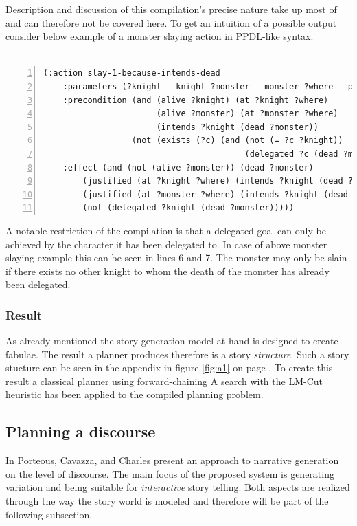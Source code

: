 Description and discussion of this compilation's precise nature take up most of \cite{Haslum14} and can therefore not be covered here. To get an intuition of a possible output consider below example of a monster slaying action in PPDL-like syntax.\\
\\
\begin{lstlisting}[frame=single,basicstyle=\scriptsize,numbers=left,numberstyle=\tiny]
(:action slay-1-because-intends-dead
    :parameters (?knight - knight ?monster - monster ?where - place)
    :precondition (and (alive ?knight) (at ?knight ?where)
                       (alive ?monster) (at ?monster ?where)
                       (intends ?knight (dead ?monster))
                  (not (exists (?c) (and (not (= ?c ?knight))
                                         (delegated ?c (dead ?monster))))))
    :effect (and (not (alive ?monster)) (dead ?monster)
        (justified (at ?knight ?where) (intends ?knight (dead ?monster)))
        (justified (at ?monster ?where) (intends ?knight (dead ?monster)))
        (not (delegated ?knight (dead ?monster)))))
\end{lstlisting}
A notable restriction of the compilation is that a delegated goal can only be achieved by the character it has been delegated to. In case of above monster slaying example this can be seen in lines 6 and 7. The monster may only be slain if there exists no other knight to whom the death of the monster has already been delegated.
\subsubsection{Result}
As already mentioned the story generation model at hand is designed to create fabulae. The result a planner produces therefore is a story \emph{structure}. Such a story stucture can be seen in the appendix in figure \ref{fig:a1} on page \pageref{fig:a2}. To create this result a classical planner using forward-chaining A\text{*} search with the LM-Cut heuristic has been applied to the compiled planning problem.

\subsection{Planning a discourse}\label{discourse}
In \cite{Porteous10} Porteous, Cavazza, and Charles present an approach to narrative generation on the level of discourse. The main focus of the proposed system is generating variation and being suitable for \emph{interactive} story telling. Both aspects are realized through the way the story world is modeled and therefore will be part of the following subsection.
